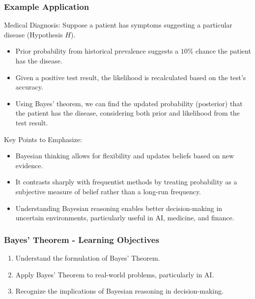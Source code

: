 \documentclass[aspectratio=169]{beamer}
\begin{document}
\begin{frame}[fragile]
    \frametitle{Example Application}
    \begin{block}{Medical Diagnosis:}
        Suppose a patient has symptoms suggesting a particular disease (Hypothesis $H$). 
        \begin{itemize}
            \item Prior probability from historical prevalence suggests a $10\%$ chance the patient has the disease.
            \item Given a positive test result, the likelihood is recalculated based on the test's accuracy.
            \item Using Bayes' theorem, we can find the updated probability (posterior) that the patient has the disease, considering both prior and likelihood from the test result.
        \end{itemize}
    \end{block}
    
    \begin{block}{Key Points to Emphasize:}
        \begin{itemize}
            \item Bayesian thinking allows for flexibility and updates beliefs based on new evidence.
            \item It contrasts sharply with frequentist methods by treating probability as a subjective measure of belief rather than a long-run frequency.
            \item Understanding Bayesian reasoning enables better decision-making in uncertain environments, particularly useful in AI, medicine, and finance.
        \end{itemize}
    \end{block}
\end{frame}

\begin{frame}[fragile]
    \frametitle{Bayes' Theorem - Learning Objectives}
    \begin{enumerate}
        \item Understand the formulation of Bayes' Theorem.
        \item Apply Bayes' Theorem to real-world problems, particularly in AI.
        \item Recognize the implications of Bayesian reasoning in decision-making.
    \end{enumerate}
\end{frame}
\end{document}
